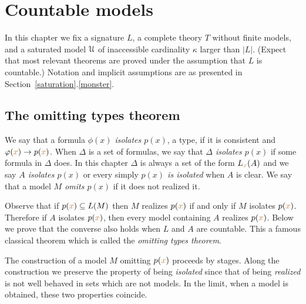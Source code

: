 \documentclass[creche.tex]{subfiles}
\begin{document}
\chapter{Countable models}
\label{countable}

\def\ceq#1#2#3{\parbox[b]{30ex}{$\displaystyle #1$}\parbox[b]{6ex}{\hfil$#2$}$\displaystyle #3$}




In this chapter we fix a signature $L$, a complete theory $T$ without finite models, and a saturated model $\EuScript U$ of inaccessible cardinality $\kappa$ larger than $|L|$. (Expect that most relevant theorems are proved under the assumption that $L$ is countable.) Notation and implicit assumptions are as presented in Section~\ref{saturation}.\ref{monster}.



\section{The omitting types theorem}\label{omttingtype}

We say that a formula \emph{$\phi(x)$ isolates $p(x)$}, a type, if it is consistent and $\varphi({\color{brown} x})\rightarrow p({\color{brown} x})$. When $\Delta$ is a set of formulas, we say that \emph{$\Delta$ isolates $p(x)$\/} if some formula in $\Delta$ does. In this chapter $\Delta$ is always a set of the form $L_{{\color{brown} x}}(A)$ and we say  \emph{$A$ isolates $p(x)$\/} or every simply \emph{$p(x)$ is isolated\/} when $A$ is clear. We say that a model \emph{$M$ omits $p(x)$\/} if it does not realized it. 

Observe that if $p({\color{brown} x})\subseteq L(M)$ then $M$ realizes $p({\color{brown} x})$ if and only if $M$ isolates  $p({\color{brown} x})$. Therefore if $A$ isolates $p({\color{brown} x})$, then every model containing $A$ realizes $p({\color{brown} x})$. Below we prove that the converse also holds when $L$ and $A$ are countable. This a famous classical theorem  which is called the \textit{omitting types theorem}. 

The construction of a model $M$ omitting $p({\color{brown} x})$ proceeds by stages. Along the construction we preserve the property of being {\em isolated\/}  since that of being {\em realized\/} is not well behaved in sets which are not models. In the limit, when a model is obtained, these two properties coincide. 
\end{document}
